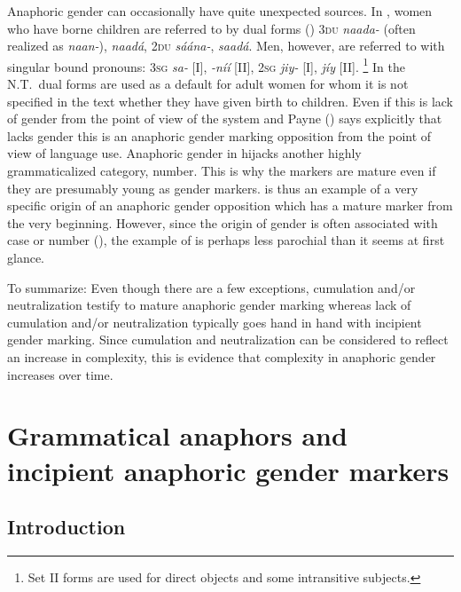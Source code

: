 \documentclass[output=collectionpaper]{langsci/langscibook}
\begin{document}
Anaphoric gender can occasionally have quite unexpected sources. In , women who have borne children are referred to by dual forms (\citealt[42]{Payne1985}) \textendash{} \textsc{3du} \textit{naada-} (often realized as \textit{naan-}), \textit{naadá}, \textsc{2du} \textit{sáána-}, \textit{saadá}. Men, however, are referred to with singular bound pronouns: \textsc{3sg} \textit{sa-} [I], \textit{-níí} [II], \textsc{2sg} \textit{jiy-} [I], \textit{jíy} [II].%
\footnote{%
Set II forms are used for direct objects and some intransitive subjects.
} %
In the N.T.\ dual forms are used as a default for adult women for whom it is not specified in the text whether they have given birth to children. Even if this is lack of gender from the point of view of the system \textendash{} and Payne (\citeyear[42]{Payne1985}) says explicitly that  lacks gender \textendash{} this is an anaphoric gender marking opposition from the point of view of language use. Anaphoric gender in  hijacks another highly grammaticalized category, number. This is why the markers are mature even if they are presumably young as gender markers.  is thus an example of a very specific origin of an anaphoric gender opposition which has a mature marker from the very beginning. However, since the origin of gender is often associated with case or number (), the example of  is perhaps less parochial than it seems at first glance.

To summarize: Even though there are a few exceptions, cumulation and/or neutralization testify to mature anaphoric gender marking whereas lack of cumulation and/or neutralization typically goes hand in hand with incipient gender marking. Since cumulation and neutralization can be considered to reflect an increase in complexity, this is evidence that complexity in anaphoric gender increases over time.

\section{Grammatical anaphors and incipient anaphoric gender markers}
\label{sec:BW:5}

\subsection{Introduction}
\label{sec:BW:5.1}
\end{document}
